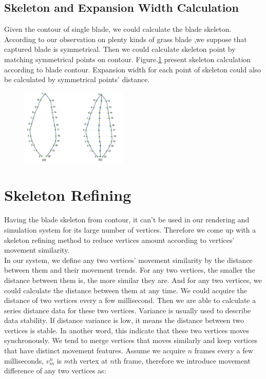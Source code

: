 \documentclass[10pt,journal,compsoc]{IEEEtran}
\begin{document}
\subsection{Skeleton and Expansion Width Calculation}
Given the contour of single blade, we could calculate the blade skeleton. According to our observation on plenty kinds of grass blade ,we suppose that captured blade is symmetrical. Then we could calculate skeleton point by matching symmetrical points on contour. Figure.\ref{fig:skeleton} present skeleton calculation according to blade contour. Expansion width for each point of skeleton could also be calculated by symmetrical points' distance.

\begin{figure}
    \centering
    \includegraphics[width=0.45\textwidth]{figs/skeletoncal.jpg}
    \label{fig:skeleton}
\end{figure}

\section{Skeleton Refining}\label{sec:Refining}
Having the blade skeleton from contour, it can't be used in our rendering and simulation system for its large number of vertices. Therefore we come up with a skeleton refining method to reduce vertices amount according to vertices' movement similarity.\\

In our system, we define any two vertices' movement similarity by the distance between them and their movement trends. For any two vertices, the smaller the distance between them is, the more similar they are. And for any two vertices, we could calculate the distance between them at any time. We could acquire the distance of two vertices every a few millisecond. Then we are able to calculate a series distance data for these two vertices. Variance is usually used to describe data stability. If distance variance is low, it means the distance between two vertices is stable. In another word, this indicate that these two vertices moves synchronously. We tend to merge vertices that moves similarly and keep vertices that have distinct movement features. Assume we acquire $n$ frames every a few milliseconds, $v_{m}^{n}$ is $m$th vertex at $n$th frame, therefore we introduce movement difference of any two vertices as:
\end{document}
